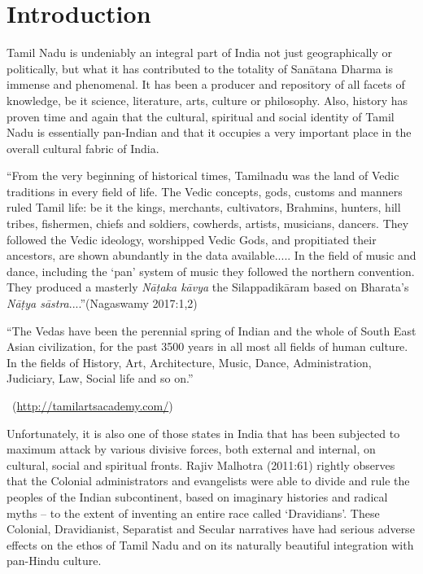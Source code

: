 \section*{Introduction}

Tamil Nadu is undeniably an integral part of India not just geographically or politically, but what it has contributed to the totality of Sanātana Dharma is immense and phenomenal. It has been a producer and repository of all facets of knowledge, be it science, literature, arts, culture or philosophy. Also, history has proven time and again that the cultural, spiritual and social identity of Tamil Nadu is essentially pan-Indian and that it occupies a very important place in the overall cultural fabric of India.

\begin{myquote}
“From the very beginning of historical times, Tamilnadu was the land of Vedic traditions in every field of life. The Vedic concepts, gods, customs and manners ruled Tamil life: be it the kings, merchants, cultivators, Brahmins, hunters, hill tribes, fishermen, chiefs and soldiers, cowherds, artists, musicians, dancers. They followed the Vedic ideology, worshipped Vedic Gods, and propitiated their ancestors, are shown abundantly in the data available..... In the field of music and dance, including the ‘pan’ system of music they followed the northern convention. They produced a masterly \textit{Nāṭaka kāvya} the Silappadikāram based on Bharata’s \textit{Nāṭya sāstra}....”\hfill (Nagaswamy 2017:1,2)
\end{myquote}

\vskip 5pt

\begin{myquote}
“The Vedas have been the perennial spring of Indian and the whole of South East Asian civilization, for the past 3500 years in all most all fields of human culture. In the fields of History, Art, Architecture, Music, Dance, Administration, Judiciary, Law, Social life and so on.”

~\hfill (\url{http://tamilartsacademy.com/})
\end{myquote}

Unfortunately, it is also one of those states in India that has been subjected to maximum attack by various divisive forces, both external and internal, on cultural, social and spiritual fronts. Rajiv Malhotra (2011:61) rightly observes that the Colonial administrators and evangelists were able to divide and rule the peoples of the Indian subcontinent, based on imaginary histories and radical myths – to the extent of inventing an entire race called ‘Dravidians’. These Colonial, Dravidianist, Separatist and Secular narratives have had serious adverse effects on the ethos of Tamil Nadu and on its naturally beautiful integration with pan-Hindu culture.

